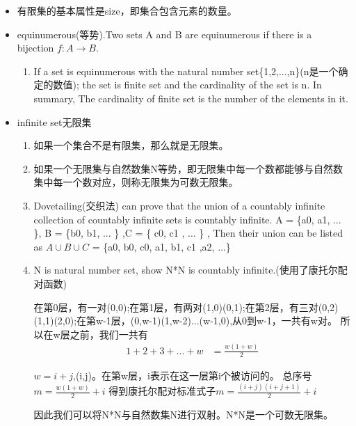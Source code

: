 \documentclass[UTF8]{ctexart}
\begin{document}
\begin{itemize}
    \item 有限集的基本属性是size，即集合包含元素的数量。
    \item equinumerous(等势).Two sets A and B are equinumerous if there is a bijection $f:A \rightarrow B$.
    \begin{enumerate}
        \item If a set is equinumerous with the natural number set\{1,2,...,n\}(n是一个确定的数值); the set is finite set and the cardinality of the set is n. In summary, The cardinality of finite set is the number of the elements in it.
    \end{enumerate}
    \item infinite set无限集
    \begin{enumerate}
        \item 如果一个集合不是有限集，那么就是无限集。
        \item 如果一个无限集与自然数集N等势，即无限集中每一个数都能够与自然数集中每一个数对应，则称无限集为可数无限集。
        \item Dovetailing(交织法) can prove that the union of a countably infinite collection of countably infinite sets is countably infinite. A = \{a0, a1, ... \}, B = \{b0, b1, ... \} ,C = \{ c0, c1 , ... \} , Then their union can be listed as $A \cup B \cup C$ = \{a0, b0, c0, a1, b1, c1 ,a2, ...\} 
        \item N is natural number set, show N*N is countably infinite.(使用了康托尔配对函数)
        
        在第0层，有一对(0,0);在第1层，有两对(1,0)(0,1);在第2层，有三对(0,2)(1,1)(2,0);在第w-1层，(0,w-1)(1,w-2)...(w-1,0),从0到w-1，一共有w对。
        所以在w层之前，我们一共有
        \begin{equation}
            \begin{aligned}
                1+2+3+...+w &= \frac{w(1+w)}{2}
            \end{aligned}
        \end{equation}

        $w=i+j$,(i,j)。在第w层，i表示在这一层第i个被访问的。
        总序号$m=\frac{w(1+w)}{2}+i$    
        得到康托尔配对标准式子$m=\frac{(i+j)(i+j+1)}{2}+i$  

        因此我们可以将N*N与自然数集N进行双射。N*N是一个可数无限集。
    \end{enumerate}
\end{itemize}
\end{document}
